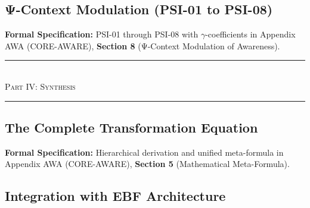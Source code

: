 \subsection{Ψ-Context Modulation (PSI-01 to PSI-08)}
\label{subsec:11-17-psi-modulation}



\begin{cross-reference}
\textbf{Formal Specification:} PSI-01 through PSI-08 with $\gamma$-coefficients in
Appendix AWA (CORE-AWARE), \textbf{Section 8} (Ψ-Context Modulation of Awareness).
\end{cross-reference}



\begin{center}
\rule{0.8\textwidth}{0.4pt}\\[0.5em]
{\large\textsc{Part IV: Synthesis}}\\[0.3em]
\rule{0.8\textwidth}{0.4pt}
\end{center}

\subsection{The Complete Transformation Equation}
\label{subsec:11-18-transformation}



\begin{cross-reference}
\textbf{Formal Specification:} Hierarchical derivation and unified meta-formula in
Appendix AWA (CORE-AWARE), \textbf{Section 5} (Mathematical Meta-Formula).
\end{cross-reference}

\subsection{Integration with EBF Architecture}
\label{subsec:11-19-integration}

